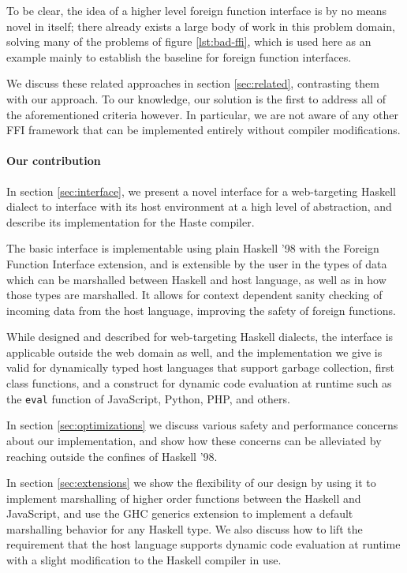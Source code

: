\documentclass[preprint]{sigplanconf}
\begin{document}
To be clear, the idea of a higher level foreign function interface is by no
means novel in itself;
there already exists a large body of work in this problem domain, solving many
of the problems of figure \ref{lst:bad-ffi},
which is used here as an example mainly to
establish the baseline for foreign function interfaces.

We discuss these related approaches in section \ref{sec:related}, contrasting
them with our approach. To our knowledge, our solution is the first to address
all of the aforementioned criteria however.
In particular, we are not aware of any other FFI framework that can be
implemented entirely without compiler modifications.

\paragraph{Our contribution}\label{sec:contrib}
In section \ref{sec:interface}, we present a novel interface for a web-targeting
Haskell dialect to interface with its host environment at a high level of
abstraction, and describe its implementation for the Haste compiler.

The basic interface is implementable using plain Haskell '98 with the
Foreign Function Interface extension, and is extensible by the user in the
types of data which can be marshalled between Haskell and host language,
as well as in how those types are marshalled.
It allows for context dependent sanity
checking of incoming data from the host language, improving the safety
of foreign functions.

While designed and described for web-targeting Haskell dialects, the interface
is applicable outside the web domain as well, and the implementation we give
is valid for dynamically typed host languages that support garbage collection,
first class functions, and a construct for dynamic code evaluation at
runtime such as the \lstinline!eval! function of JavaScript, Python, PHP,
and others.

In section \ref{sec:optimizations} we discuss various safety and performance
concerns about our implementation, and show how these concerns can be
alleviated by reaching outside the confines of Haskell '98.

In section \ref{sec:extensions} we show the flexibility of our design by using
it to implement marshalling of higher order functions between the Haskell and
JavaScript, and use the GHC generics extension to implement a default
marshalling behavior for any Haskell type. We also discuss how to lift the
requirement that the host language supports dynamic code evaluation at runtime
with a slight modification to the Haskell compiler in use.
\end{document}
